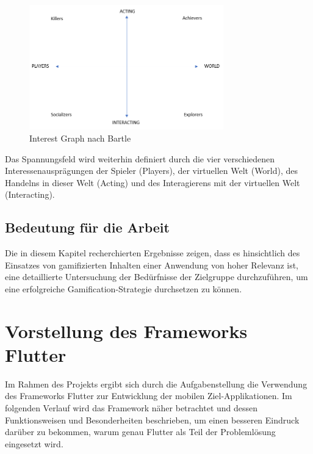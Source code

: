 \documentclass[bibliography=totoc,listof=totoc,BCOR=5mm,DIV=12,oneside]{scrbook}
\begin{document}
\bigskip
\begin{figure}[H]
	\centering
	\includegraphics[width=0.75\textwidth, keepaspectratio]{Bilder/Diagramme/InterestGraphBartle.png}
	\caption{Interest Graph nach Bartle \cite{bartle1996hearts}}
	\label{img:interetGraphBartle}
\end{figure}

\par \bigskip Das Spannungsfeld wird weiterhin definiert durch die vier verschiedenen Interessenausprägungen der Spieler (Players), der virtuellen Welt (World), des Handelns in dieser Welt (Acting) und des Interagierens mit der virtuellen Welt (Interacting).

\newpage
\subsection{Bedeutung für die Arbeit}
\par Die in diesem Kapitel recherchierten Ergebnisse zeigen, dass es hinsichtlich des Einsatzes von gamifizierten Inhalten einer Anwendung von hoher Relevanz ist, eine detaillierte Untersuchung der Bedürfnisse der Zielgruppe durchzuführen, um eine erfolgreiche Gamification-Strategie durchsetzen zu können.

\section{Vorstellung des Frameworks Flutter}
\label{chap:flutter}
\par Im Rahmen des Projekts ergibt sich durch die Aufgabenstellung die Verwendung des Frameworks Flutter zur Entwicklung der mobilen Ziel-Applikationen. Im folgenden Verlauf wird das Framework näher betrachtet und dessen Funktionsweisen und Besonderheiten beschrieben, um einen besseren Eindruck darüber zu bekommen, warum genau Flutter als Teil der Problemlösung eingesetzt wird.
\end{document}
